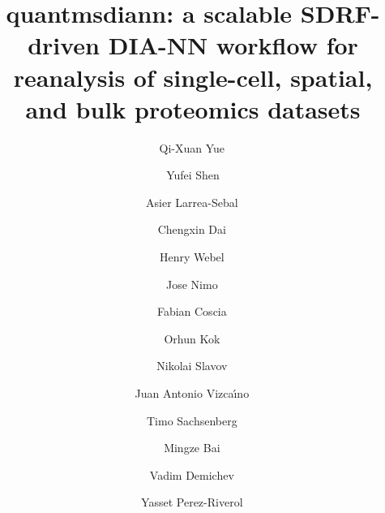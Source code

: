 \documentclass[preprint,12pt]{elsarticle}
\begin{document}
\begin{frontmatter}

\title{quantmsdiann: a scalable SDRF-driven DIA-NN workflow for reanalysis of single-cell, spatial, and bulk proteomics datasets}

\author[aff1]{Qi-Xuan Yue\,}
\author[aff1]{Yufei Shen}
\author[aff3,aff4]{Asier Larrea-Sebal\,}
\author[aff2]{Chengxin Dai\,}
\author[aff5]{Henry Webel\,}
\author[aff7,aff12,aff13]{Jose Nimo\,}
\author[aff7,aff13]{Fabian Coscia\,}
\author[aff8]{Orhun Kok\,}
\author[aff8,aff9]{Nikolai Slavov\,}
\author[aff3]{Juan Antonio Vizca\'{\i}no\,}
\author[aff10,aff11]{Timo Sachsenberg\,}
\author[aff1]{Mingze Bai\,}
\author[aff6]{Vadim Demichev\,}
\author[aff3]{Yasset Perez-Riverol\,}



\end{frontmatter}
\end{document}
